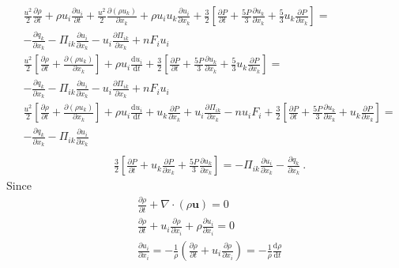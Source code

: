 \documentclass[12pt,a4paper]{article}
\renewcommand{\vec}[1]{\boldsymbol{#1}}
\newcommand{\dif}{\mathrm{d}}
\begin{document}
\begin{align*}
& \boxed{\frac{u^2}{2} \frac{\partial \rho}{\partial t} +\rho u_i\frac{\partial u_i}{\partial t} +\frac{u^2}{2} \frac{\partial \left(\rho u_k \right)}{\partial x_k} +\rho u_i u_k \frac{\partial u_i}{\partial x_k} +\frac{3}{2} \left[\frac{\partial P}{\partial t} +\frac{5P}{3} \frac{\partial u_k}{\partial x_k} +\frac{5}{3} u_k\frac{\partial P}{\partial x_k}\right] = }\\ 
& \boxed{ -\frac{\partial q_k}{\partial x_k} -\Pi_{ik} \frac{\partial u_i}{\partial x_k} -u_i \frac{\partial \Pi_{ik}}{\partial x_k} +n F_i u_i }\\
& \boxed{ \frac{u^2}{2}\left[ \frac{\partial \rho}{\partial t} +\frac{\partial \left(\rho u_k \right)}{\partial x_k} \right] +\rho u_i\frac{\dif u_i}{\dif t} +\frac{3}{2} \left[\frac{\partial P}{\partial t} +\frac{5P}{3} \frac{\partial u_k}{\partial x_k} +\frac{5}{3} u_k\frac{\partial P}{\partial x_k}\right] = }\\ 
& \boxed{ -\frac{\partial q_k}{\partial x_k} -\Pi_{ik} \frac{\partial u_i}{\partial x_k} -u_i \frac{\partial \Pi_{ik}}{\partial x_k} +n F_i u_i } \\
& \boxed{ \frac{u^2}{2}\left[ \frac{\partial \rho}{\partial t} +\frac{\partial \left(\rho u_k \right)}{\partial x_k} \right] +\rho u_i\frac{\dif u_i}{\dif t} +u_k\frac{\partial P}{\partial x_k} +u_i \frac{\partial \Pi_{ik}}{\partial x_k} -n u_i F_i + \frac{3}{2} \left[\frac{\partial P}{\partial t} +\frac{5P}{3} \frac{\partial u_k}{\partial x_k} + u_k\frac{\partial P}{\partial x_k}\right] = }\\ 
& \boxed{  -\frac{\partial q_k}{\partial x_k} -\Pi_{ik} \frac{\partial u_i}{\partial x_k} } \\
\end{align*}
\begin{align*}
& \frac{3}{2} \left[\frac{\partial P}{\partial t} +u_k \frac{\partial P}{\partial x_k} +\frac{5P}{3} \frac{\partial u_k}{\partial x_k}\right]  = -\Pi_{ik} \frac{\partial u_i}{\partial x_k} -\frac{\partial q_k}{\partial x_k} ~.
\end{align*}
Since
\begin{align*}
& \boxed{ \frac{\partial \rho}{\partial t} +\nabla \cdot (\rho \vec{u}) = 0 }\\
& \boxed{ \frac{\partial \rho}{\partial t} +u_i \frac{\partial \rho}{\partial x_i} +\rho \frac{\partial u_i}{\partial x_i} = 0 } \\
& \boxed{ \frac{\partial u_i}{\partial x_i} = -\frac{1}{\rho} \left(\frac{\partial \rho}{\partial t} +u_i \frac{\partial \rho}{\partial x_i} \right) = -\frac{1}{\rho} \frac{\dif \rho}{\dif t} }
\end{align*}
\end{document}
